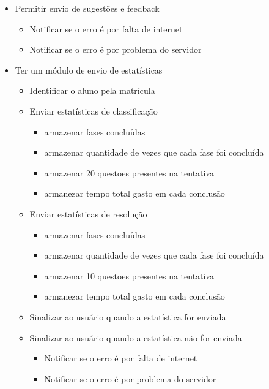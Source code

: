 \begin{itemize}
	\item Permitir envio de sugestões e feedback
		\begin{itemize}
			\item Notificar se o erro é por falta de internet
			\item Notificar se o erro é por problema do servidor			
		\end{itemize}

	\item Ter um módulo de envio de estatísticas
		\begin{itemize}
			\item Identificar o aluno pela matrícula
			\item Enviar estatísticas de classificação
				\begin{itemize}
					\item armazenar fases concluídas
					\item armazenar quantidade de vezes que cada fase foi concluída
					\item armazenar 20 questoes presentes na tentativa
					\item armanezar tempo total gasto em cada conclusão
				\end{itemize}
			\item Enviar estatísticas de resolução
				\begin{itemize}
					\item armazenar fases concluídas
					\item armazenar quantidade de vezes que cada fase foi concluída
					\item armazenar 10 questoes presentes na tentativa
					\item armanezar tempo total gasto em cada conclusão
				\end{itemize}
			\item Sinalizar ao usuário quando a estatística for enviada
			\item Sinalizar ao usuário quando a estatística não for enviada
				\begin{itemize}
					\item Notificar se o erro é por falta de internet
					\item Notificar se o erro é por problema do servidor
				\end{itemize}
		\end{itemize}
\end{itemize}
